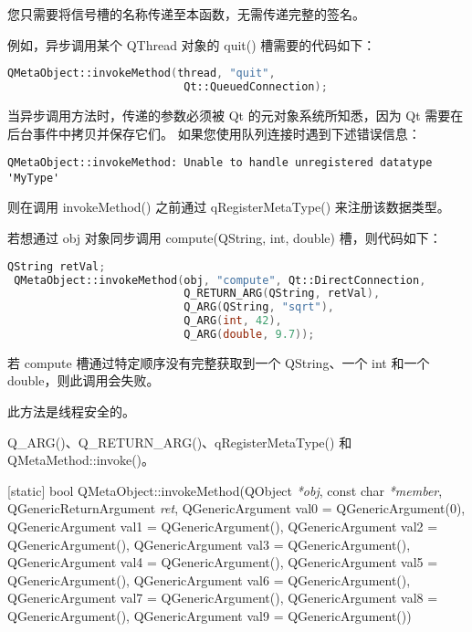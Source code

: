 您只需要将信号槽的名称传递至本函数，无需传递完整的签名。

例如，异步调用某个 QThread 对象的 quit() 槽需要的代码如下：

\begin{lstlisting}[language=C++]
QMetaObject::invokeMethod(thread, "quit",
                           Qt::QueuedConnection);
\end{lstlisting}

当异步调用方法时，传递的参数必须被 Qt 的元对象系统所知悉，因为 Qt 需要在后台事件中拷贝并保存它们。
如果您使用队列连接时遇到下述错误信息：

\begin{lstlisting}
QMetaObject::invokeMethod: Unable to handle unregistered datatype 'MyType'
\end{lstlisting}

则在调用 invokeMethod() 之前通过 qRegisterMetaType() 来注册该数据类型。

若想通过 obj 对象同步调用 compute(QString, int, double) 槽，则代码如下：

\begin{lstlisting}[language=C++]
 QString retVal;
 QMetaObject::invokeMethod(obj, "compute", Qt::DirectConnection,
                           Q_RETURN_ARG(QString, retVal),
                           Q_ARG(QString, "sqrt"),
                           Q_ARG(int, 42),
                           Q_ARG(double, 9.7));
\end{lstlisting}

若 compute 槽通过特定顺序没有完整获取到一个 QString、一个 int 和一个 double，则此调用会失败。

\begin{notice}
此方法是线程安全的。
\end{notice}

\begin{seeAlso}
Q\_ARG()、Q\_RETURN\_ARG()、qRegisterMetaType() 和 QMetaMethod::invoke()。
\end{seeAlso}


[static] bool QMetaObject::invokeMethod(QObject \emph{*obj}, const char \emph{*member}, QGenericReturnArgument \emph{ret}, 
QGenericArgument val0 = QGenericArgument(0), QGenericArgument val1 = QGenericArgument(), 
QGenericArgument val2 = QGenericArgument(), 
QGenericArgument val3 = QGenericArgument(), QGenericArgument val4 = QGenericArgument(), 
QGenericArgument val5 = QGenericArgument(), QGenericArgument val6 = QGenericArgument(), 
QGenericArgument val7 = QGenericArgument(), QGenericArgument val8 = QGenericArgument(), 
QGenericArgument val9 = QGenericArgument())


